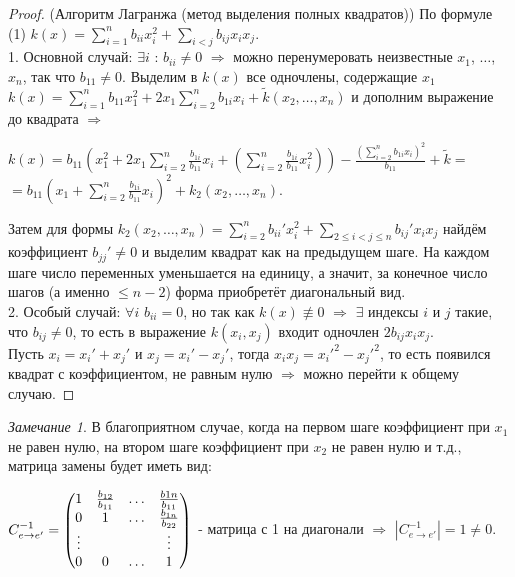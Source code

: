 \documentclass[a4paper, 12pt]{article}
\theoremstyle{definition}
\theoremstyle{plain}
\theoremstyle{remark}
\newtheorem*{remark}{Замечание}
\begin{document}
  \begin{proof} (Алгоритм Лагранжа (метод выделения полных квадратов))
    По формуле (1) $k(x)=\sum\limits_{i=1}^nb_{ii}x_i^2+\sum\limits_{i<j}b_{ij}x_ix_j$.\\
    1. Основной случай: $\exists i$ : $b_{ii}\neq0$ $\Longrightarrow$ можно перенумеровать неизвестные $x_1$, $\ldots$, $x_n$, так что $b_{11}\neq0$. Выделим в $k(x)$ все одночлены, содержащие $x_1$\\
    $k(x)=\sum\limits_{i=1}^nb_{11}x_1^2+2x_1\sum\limits_{i=2}^nb_{1i}x_i+\widetilde{k}(x_2,\ldots, x_n)$ и дополним выражение до квадрата $\Longrightarrow$\\
    \begin{center}
      $k(x) = b_{11}(x_1^2+2x_1\sum\limits_{i=2}^n\frac{b_{1i}}{b_{11}}x_i+(\sum\limits_{i=2}^n\frac{b_{1i}}{b_{11}}x_i^2))-\frac{(\sum\limits_{i=2}^nb_{1i}x_i)^2}{b_{11}}+\widetilde{k} = $\\
      $=b_{11}(x_1+\sum\limits_{i=2}^n\frac{b_{1i}}{b_{11}}x_i)^2+k_2(x_2, \ldots,x_n)$.
    \end{center}
    Затем для формы $k_2(x_2,\ldots, x_n)=\sum\limits_{i=2}^nb_{ii}'x_i^2+\sum\limits_{2\leqslant i<j\leqslant n}b_{ij}'x_ix_j$ найдём коэффициент $b_{jj}'\neq0$ и выделим квадрат как на предыдущем шаге. На каждом шаге число переменных уменьшается на единицу, а значит, за конечное число шагов (а именно $\leqslant n-2$) форма приобретёт диагональный вид.\\
    2. Особый случай: $\forall i$ $b_{ii}=0$, но так как $k(x)\not\equiv0$ $\Longrightarrow$ $\exists$ индексы $i$ и $j$ такие, что $b_{ij}\neq0$, то есть в выражение $k(x_i, x_j)$ входит одночлен $2b_{ij}x_ix_j$.\\
    Пусть $x_i=x_i'+x_j'$ и $x_j=x_i'-x_j'$, тогда $x_ix_j = x_i'^2-x_j'^2$, то есть появился квадрат с коэффициентом, не равным нулю $\Longrightarrow$ можно перейти к общему случаю. 
  \end{proof}
  \begin{remark}
    В благоприятном случае, когда на первом шаге коэффициент при $x_1$ не равен нулю, на втором шаге коэффициент при $x_2$ не равен нулю и т.д., матрица замены будет иметь вид:\\
    \begin{center}
      $C_{e\rightarrow e'}^{-1}=\begin{pmatrix}
        1 & \frac{b_{12}}{b_{11}} & \ldots & \frac{b{1n}}{b_{11}}\\
        0 & 1 & \ldots & \frac{b_{1n}}{b_{22}}\\
        \vdots & \null & \null & \vdots\\
        0 & 0 & \ldots & 1
      \end{pmatrix}$ - матрица с 1 на диагонали $\Longrightarrow$ $|C_{e\rightarrow e'}^{-1}|=1\neq0$.
    \end{center}
  \end{remark}
\end{document}
